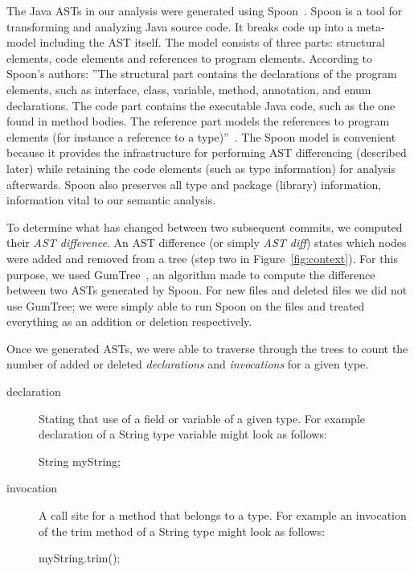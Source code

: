 The Java ASTs in our analysis were generated using Spoon~\cite{pawlak:hal-01169705}. Spoon is a tool for transforming and analyzing Java source code. It breaks code up into a meta-model including the AST itself. The model consists of three parts: structural elements, code elements and references to program elements. According to Spoon's authors: ''The structural part contains the declarations of the program elements, such as interface, class, variable, method, annotation, and enum declarations.  The code part contains the executable Java code, such as the one found in method bodies. The reference part models the references to program elements (for instance a reference to a type)''~\cite{pawlak:hal-01169705}. The Spoon model is convenient because it provides the infrastructure for performing AST differencing (described later) while retaining the code elements (such as type information) for analysis afterwards. Spoon also preserves all type and package (library) information, information vital to our semantic analysis.

To determine what has changed between two subsequent commits, we computed their \emph{AST difference}. An AST difference (or simply \emph{AST diff}) states which nodes were added and removed from a tree (step two in Figure~\ref{fig:context}). For this purpose, we used GumTree~\cite{falleri:hal-01054552}, an algorithm made to compute the difference between two ASTs generated by Spoon. For new files and deleted files we did not use GumTree; we were simply able to run Spoon on the files and treated everything as an addition or deletion respectively.

Once we generated ASTs, we were able to traverse through the trees to count the number of added or deleted \emph{declarations} and \emph{invocations} for a given type.

\begin{description}
\item [declaration] 
  Stating that use of a field or variable of a given type. For example declaration of a String type variable might look as follows:
  \\
  \begin{adjustwidth}{2.5em}{0pt}
  String myString; \\
  \end{adjustwidth}
\item [invocation] 
  A call site for a method that belongs to a type. For example an invocation of the trim method of a String type might look as follows:
  \\
  \begin{adjustwidth}{2.5em}{0pt}
  myString.trim(); \\
  \end{adjustwidth}
\end{description} 

